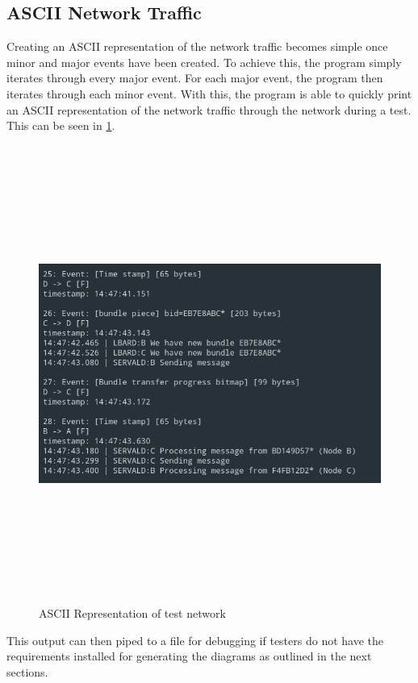 \subsection{ASCII Network Traffic}
Creating an ASCII representation of the network traffic becomes simple once minor and major events have been created.
To achieve this, the program simply iterates through every major event.
For each major event, the program then iterates through each minor event.
With this, the program is able to quickly print an ASCII representation of the network traffic through the network during a test.
This can be seen in \figurename{ \ref{fig:chapter5ASCIIRep}}.
\begin{figure}
    \begin{centering}
        \includegraphics[width=15cm,height=15cm,keepaspectratio]{Figures/Chapter5-ASCIIRepresentation.png}
        \caption{ASCII Representation of test network}
        \label{fig:chapter5ASCIIRep}
    \end{centering}
\end{figure}

This output can then piped to a file for debugging if testers do not have the requirements installed for generating the diagrams as outlined in the next sections.




